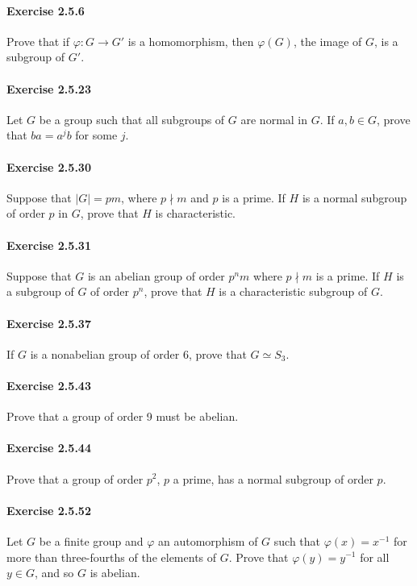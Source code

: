 \documentclass{article}
\begin{document}
\paragraph{Exercise 2.5.6} Prove that if $\varphi \colon G \rightarrow G'$ is a homomorphism, then $\varphi(G)$, the image of $G$, is a subgroup of $G'$.

\paragraph{Exercise 2.5.23} Let $G$ be a group such that all subgroups of $G$ are normal in $G$. If $a, b \in G$, prove that $ba = a^jb$ for some $j$.

\paragraph{Exercise 2.5.30} Suppose that $|G| = pm$, where $p \nmid m$ and $p$ is a prime. If $H$ is a normal subgroup of order $p$ in $G$, prove that $H$ is characteristic.

\paragraph{Exercise 2.5.31} Suppose that $G$ is an abelian group of order $p^nm$ where $p \nmid m$ is a prime.  If $H$ is a subgroup of $G$ of order $p^n$, prove that $H$ is a characteristic subgroup of $G$.

\paragraph{Exercise 2.5.37} If $G$ is a nonabelian group of order 6, prove that $G \simeq S_3$.

\paragraph{Exercise 2.5.43} Prove that a group of order 9 must be abelian.

\paragraph{Exercise 2.5.44} Prove that a group of order $p^2$, $p$ a prime, has a normal subgroup of order $p$.

\paragraph{Exercise 2.5.52} Let $G$ be a finite group and $\varphi$ an automorphism of $G$ such that $\varphi(x) = x^{-1}$ for more than three-fourths of the elements of $G$. Prove that $\varphi(y) = y^{-1}$ for all $y \in G$, and so $G$ is abelian.
\end{document}
